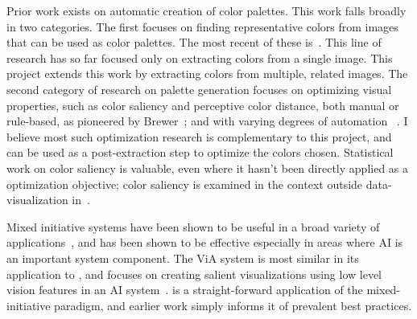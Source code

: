 Prior work exists on automatic creation of color palettes. This work falls broadly in two categories. The first focuses on finding representative  colors from images that can be used as color palettes. The most recent of these is~\cite{morse2007image}. This line of research has so far focused only on extracting colors from a single image. This project extends this work by extracting colors from multiple, related images. The second category of research on palette generation focuses on optimizing visual properties, such as color saliency and perceptive color distance, both manual or rule-based, as pioneered by Brewer~\cite{brewer1999color}; and  with varying degrees of automation ~\cite{healey1996choosing, zeileis2009RGBland}. I believe most such optimization research is complementary to this project, and can be used as a post-extraction step to optimize the colors chosen. Statistical work on color saliency is valuable, even where it hasn't been directly applied as a optimization objective; color saliency is examined in the context outside data-visualization in~\cite{chuang2008probabilistic, benavente2002statistical}. 

Mixed initiative systems have been shown to be useful in a broad variety of applications~\cite{hearst1999mixed}, and has been shown to be effective especially in areas where AI is an important system component. The ViA system is most similar in its application to \system, and focuses on creating salient visualizations using low level vision features in an AI system~\cite{healey2008visual}. \system is a straight-forward application of the mixed-initiative paradigm, and earlier work simply informs it of prevalent best practices.
